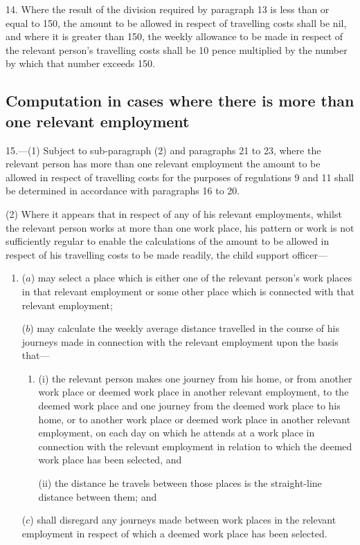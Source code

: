 \documentclass[a4paper]{article}
\begin{document}
\medskip

14.  Where the result of the division required by paragraph 13 is less than or equal to 150, the amount to be allowed in respect of travelling costs shall be nil, and where it is greater than 150, the weekly allowance to be made in respect of the relevant person’s travelling costs shall be 10 pence multiplied by the number by which that number exceeds 150.

\subsection*{Computation in cases where there is more than one relevant employment}

15.—(1) Subject to sub-paragraph (2) and paragraphs 21 to 23, where the relevant person has more than one relevant employment the amount to be allowed in respect of travelling costs for the purposes of regulations 9 and 11 shall be determined in accordance with paragraphs 16 to 20.

(2) Where it appears that in respect of any of his relevant employments, whilst the relevant person works at more than one work place, his pattern or work is not sufficiently regular to enable the calculations of the amount to be allowed in respect of his travelling costs to be made readily, the child support officer—
\begin{enumerate}\item[]
($a$) may select a place which is either one of the relevant person’s work places in that relevant employment or some other place which is connected with that relevant employment;

($b$) may calculate the weekly average distance travelled in the course of his journeys made in connection with the relevant employment upon the basis that—
\begin{enumerate}\item[]
(i) the relevant person makes one journey from his home, or from another work place or deemed work place in another relevant employment, to the deemed work place and one journey from the deemed work place to his home, or to another work place or deemed work place in another relevant employment, on each day on which he attends at a work place in connection with the relevant employment in relation to which the deemed work place has been selected, and

(ii) the distance he travels between those places is the straight-line distance between them; and
\end{enumerate}

($c$) shall disregard any journeys made between work places in the relevant employment in respect of which a deemed work place has been selected.
\end{enumerate}
\end{document}
